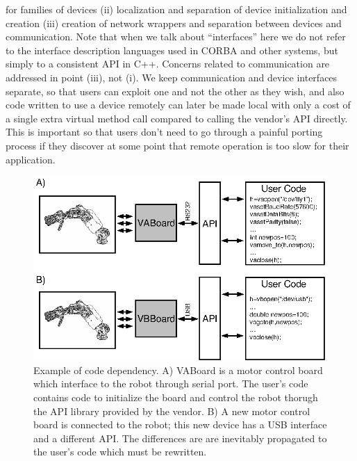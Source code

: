 for families of devices (ii) localization and separation of device 
initialization and creation (iii) creation of network wrappers and separation 
between devices and communication. 
%
Note that when we talk about ``interfaces'' here we do not refer to
the interface description languages used in CORBA and other systems,
but simply to a consistent API in C++.  Concerns related to
communication are addressed in point (iii), not (i).  We keep
communication and device interfaces separate, so that users can
exploit one and not the other as they wish, and also code written to
use a device remotely can later be made local with only a cost of a
single extra virtual method call compared to calling the vendor's API directly.
This is important so that users don't need to go through a painful
porting process if they discover at some point that remote operation
is too slow for their application.

\begin{figure}[tbp]
\centerline{
\includegraphics[width=24cm]{fig-devices1}
}
\caption{Example of code dependency. A) VABoard is a 
motor control board which interface to the robot through serial port. 
The user's code contains code to initialize the board and control the 
robot thorugh the API library provided by the vendor. B) A new 
motor control board is connected to the robot; this new device has a 
USB interface and a different API. The differences are 
are inevitably propagated to the user's code which must be 
rewritten.}\label{fig:devices1}
\end{figure}

